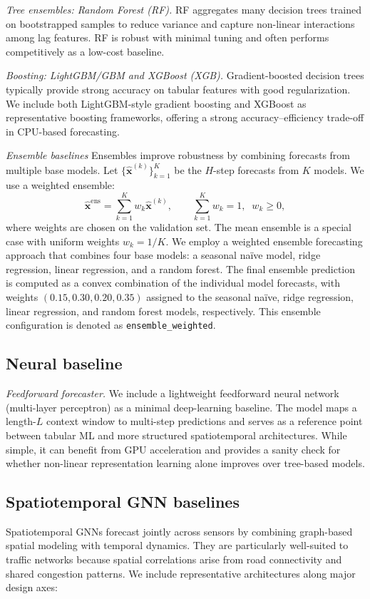 \documentclass[10pt]{article}
\begin{document}
\textit{Tree ensembles: Random Forest (RF).}
RF aggregates many decision trees trained on bootstrapped samples to reduce variance and capture non-linear
interactions among lag features. RF is robust with minimal tuning and often performs competitively as a
low-cost baseline.

\textit{Boosting: LightGBM/GBM and XGBoost (XGB).}
Gradient-boosted decision trees typically provide strong accuracy on tabular features with good regularization.
We include both LightGBM-style gradient boosting and XGBoost as representative boosting frameworks, offering
a strong accuracy--efficiency trade-off in CPU-based forecasting.

\textit{Ensemble baselines}
Ensembles improve robustness by combining forecasts from multiple base models. Let
$\{\hat{\mathbf{x}}^{(k)}\}_{k=1}^K$ be the $H$-step forecasts from $K$ models. We use a weighted ensemble:
\[
\hat{\mathbf{x}}^{\text{ens}}=\sum_{k=1}^K w_k \hat{\mathbf{x}}^{(k)}, \qquad
\sum_{k=1}^K w_k=1,\;\; w_k\ge 0,
\]
where weights are chosen on the validation set. The mean ensemble is a special case with uniform weights
$w_k=1/K$. We employ a weighted ensemble forecasting approach that combines four base models: a seasonal naïve model, ridge regression, linear regression, and a random forest. 
The final ensemble prediction is computed as a convex combination of the individual model forecasts, with weights $(0.15, 0.30, 0.20, 0.35)$ assigned to the seasonal naïve, ridge regression, linear regression, and random forest models, respectively. 
This ensemble configuration is denoted as
\texttt{ensemble\_weighted}.


\subsection{Neural baseline}
\textit{Feedforward forecaster.}
We include a lightweight feedforward neural network (multi-layer perceptron) as a minimal deep-learning baseline.
The model maps a length-$L$ context window to multi-step predictions and serves as a reference point between
tabular ML and more structured spatiotemporal architectures. While simple, it can benefit from GPU acceleration
and provides a sanity check for whether non-linear representation learning alone improves over tree-based models.

\subsection{Spatiotemporal GNN baselines}
Spatiotemporal GNNs forecast jointly across sensors by combining graph-based spatial modeling with temporal
dynamics. They are particularly well-suited to traffic networks because spatial correlations arise from road
connectivity and shared congestion patterns. We include representative architectures along major design axes:
\end{document}
